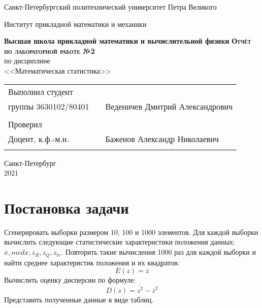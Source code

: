 \documentclass[a4paper]{article}
\begin{document}
\begin{titlepage}
  \begin{center}
    \large
    Санкт-Петербургский политехнический университет Петра Великого
    
    Институт прикладной математики и механики
    
    \textbf{Высшая школа прикладной математики и вычислительной физики}
    \vfill
    \textsc{\textbf{\large{Отчёт по лабораторной работе №2}}}\\[5mm]
     по дисциплине\\ <<Математическая статистика>>\\
\end{center}

\vfill

\begin{tabular}{l p{} l}
Выполнил студент \\группы 3630102/80401 && Веденичев Дмитрий Александрович \\
\\
Проверил\\Доцент, к.ф.-м.н.& \hspace{0pt} &   Баженов Александр Николаевич \\\\
\end{tabular}

\hfill \break
\hfill \break
\begin{center} Санкт-Петербург \\2021 \end{center}
\thispagestyle{empty}
\end{titlepage}
\newpage
\newpage
\begin{center}
    \setcounter{page}{2}
    \tableofcontents
\end{center}
\newpage
\begin{center}
    \setcounter{page}{3}
    \listoftables
\end{center}

\newpage
\section {Постановка задачи}
\noindent Сгенерировать выборки размером 10, 100 и 1000 элементов.
Для каждой выборки вычислить следующие статистические характеристики положения данных: $\overline{x}, med x, z_R, z_Q, z_{tr}.$ Повторить такие вычисления 1000 раз для каждой выборки и найти среднее характеристик положения и их квадратов:
\begin{equation}
	E(z) = \overline{z}
\end{equation}
Вычислить оценку дисперсии по формуле:
\begin{equation}
	D(z) = \overline{z^2} - \overline{z}^2
\end{equation}
Представить полученные данные в виде таблиц.
\end{document}
